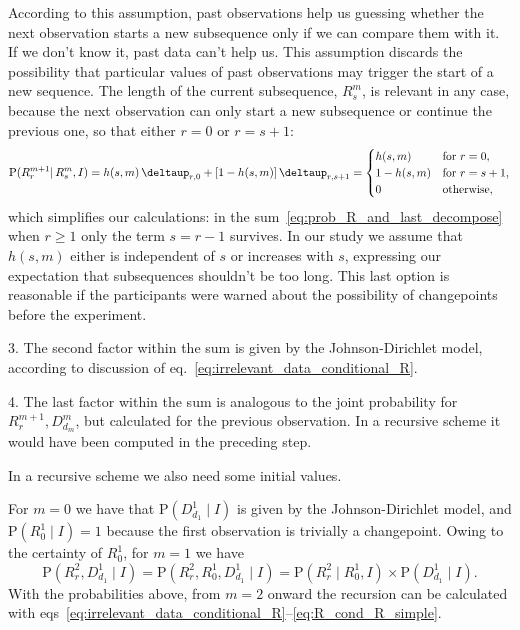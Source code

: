 \documentclass[\ifafour a4paper,12pt,\else a5paper,10pt,\fi%
onecolumn,oneside,article,%
british%
]{memoir}
\theoremstyle{remark}
\theoremstyle{innote}
\newcommand*{\delt}{\deltaup}%
\renewcommand{\ge}{\geqslant}%
\newcommand*{\p}{\mathrm{P}}%
\renewcommand*{\|}{\mathpunct{|}}
\newcommand*{\eqn}{eq.}%
\newcommand*{\eqns}{eqs}%
\newcommand*{\yI}{I}
\newcommand*{\yrs}{h}
\begin{document}
According to this assumption, past observations help us guessing whether
the next observation starts a new subsequence only if we can compare them
with it. If we don't know it, past data can't help us. This assumption
discards the possibility that particular values of past observations may
trigger the start of a new sequence. The length of the current subsequence,
$R^{m}_{s}$, is relevant in any case, because the next observation can only
start a new subsequence or continue the previous one, so that either $r=0$
or $r=s+1$:
\begin{equation}
  \label{eq:R_cond_R_simple}
  \p(R^{m+1}_{r} \| R^{m}_{s}, \yI) =
  \yrs(s,m)\,\delt_{r,0} + [1-\yrs(s,m)]\,\delt_{r,s+1} =
  \begin{cases}
    \yrs(s,m) & \text{for $r=0$},
    \\
    1-\yrs(s,m) &\text{for $r=s+1$},
    \\
    0 & \text{otherwise},
  \end{cases}
\end{equation}
which simplifies our calculations: in the
sum~\eqref{eq:prob_R_and_last_decompose} when $r\ge 1$ only the term
$s=r-1$ survives. In our study we assume that $\yrs(s,m)$ either is
independent of $s$ or increases with $s$, expressing our expectation that
subsequences shouldn't be too long. This last option is reasonable if the
participants were warned about the possibility of changepoints before the
experiment.

3. The second factor within the sum is given by the Johnson-Dirichlet
model, according to discussion of
\eqn~\eqref{eq:irrelevant_data_conditional_R}.

4. The last factor within the sum is analogous to the joint probability for
$R^{m+1}_{r}, D^{m}_{d_{m}}$, but calculated for the previous observation.
In a recursive scheme it would have been computed in the preceding step.


\bigskip

In a recursive scheme we also need some initial values.

For $m=0$ we have that $\p(D^{1}_{d_1} \| \yI)$ is given by the
Johnson-Dirichlet model, and $\p(R^{1}_{0} \| \yI)=1$ because the first
observation is trivially a changepoint. Owing to the certainty of $R^1_0$,
for $m=1$ we have
\begin{equation}
  \label{eq:initial_R2}
  \p(R^{2}_{r}, D^{1}_{d_{1}} \|  \yI)
  = \p(R^{2}_{r},R^{1}_{0}, D^{1}_{d_{1}} \|  \yI)
  = \p(R^{2}_{r} \| R^{1}_{0},  \yI) \times
  \p( D^{1}_{d_{1}} \|  \yI).
\end{equation}
With the probabilities above, from $m=2$ onward the recursion can be
calculated with
\eqns~\eqref{eq:irrelevant_data_conditional_R}--\eqref{eq:R_cond_R_simple}.
\end{document}
